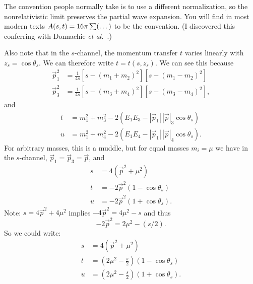 The convention people normally take is to use a different normalization,
so the nonrelativistic limit preserves the partial wave expansion. You
will find in most modern texts $A(s,t)=16\pi\sum(\dots)$ to be
the convention. (I discovered this conferring with Donnachie \textit{et al.}~\cite{Donnachie:2002en}.)

\M
Also note that in the $s$-channel, the momentum transfer $t$ varies
linearly with $z_{s} = \cos\theta_{s}$. We can therefore write $t=t(s,z_{s})$.
We can see this because
\begin{subequations}
  \begin{align}
\vec{p}_{1}^{2} &= \frac{1}{4s}[s - (m_{1}+m_{2})^{2}][s - (m_{1}-m_{2})^{2}]\\
\vec{p}_{3}^{2} &= \frac{1}{4s}[s - (m_{3}+m_{4})^{2}][s - (m_{3}-m_{4})^{2}],
  \end{align}
\end{subequations}
and
\begin{subequations}
  \begin{align}
t &= m_{1}^{2} + m_{3}^{2} - 2(E_{1}E_{3} - |\vec{p}_{1}|\,|\vec{p}|_{3}\cos\theta_{s})\\
u &= m_{1}^{2} + m_{4}^{2} - 2(E_{1}E_{4} - |\vec{p}_{1}|\,|\vec{p}|_{4}\cos\theta_{s}).
  \end{align}
\end{subequations}
For arbitrary masses, this is a muddle, but for equal masses $m_{i}=\mu$
we have in the $s$-channel, $\vec{p}_{1}=\vec{p}_{3}=\vec{p}$, and
\begin{subequations}\label{eq:introduction:mandelstam-in-cm-frame-with-identical-masses}
  \begin{align}
    s &= 4(\vec{p}^{2}+\mu^{2})\\
    t &= -2\vec{p}^{2}(1 - \cos\theta_{s})\\
    u &= -2\vec{p}^{2}(1 + \cos\theta_{s}).
\end{align}
\end{subequations}
Note: $s=4\vec{p}^{2}+4\mu^{2}$ implies $-4\vec{p}^{2}=4\mu^{2}-s$ and
thus
\begin{equation}
-2\vec{p}^{2}=2\mu^{2}-(s/2).
\end{equation}
So we could write:
\begin{subequations}
  \begin{align}
    s &= 4(\vec{p}^{2}+\mu^{2})\\
    t &= \left(2\mu^{2} - \frac{s}{2}\right)(1 - \cos\theta_{s})\\
    u &= \left(2\mu^{2} - \frac{s}{2}\right)(1 + \cos\theta_{s}).
\end{align}
\end{subequations}

